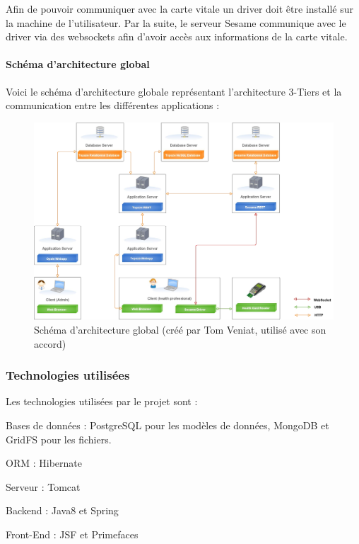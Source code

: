 Afin de pouvoir communiquer avec la carte vitale un driver doit être installé sur la machine de l'utilisateur. Par la suite, le serveur Sesame communique avec le driver via des websockets afin d'avoir accès aux informations de la carte vitale.

\paragraph*{Schéma d'architecture global\\}
Voici le schéma d'architecture globale représentant l'architecture 3-Tiers et la communication entre les différentes applications :
\begin{figure}[H]
  \centering
  \includegraphics[width=18cm]{./img/architecture2}
  \caption{\label{fig:mb_va_ast} Schéma d'architecture global (créé par Tom Veniat, utilisé avec son accord)}
\end{figure}

\subsubsection{Technologies utilisées}
Les technologies utilisées par le projet sont :
\begin{sitemize}
\item Bases de données : PostgreSQL pour les modèles de données, MongoDB et GridFS pour les fichiers.
\item ORM : Hibernate\cite{bib:hibernate}
\item Serveur : Tomcat
\item Backend : Java8\cite{bib:java8} et Spring\cite{bib:spring}
\item Front-End : JSF\cite{bib:jsf} et Primefaces
\end{sitemize} 

